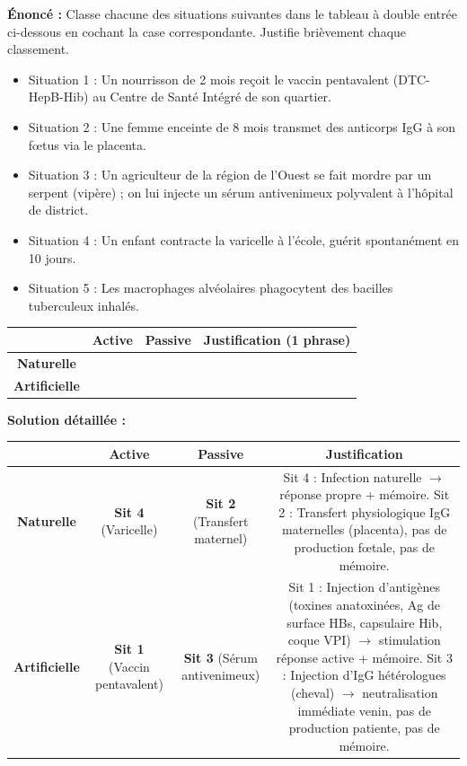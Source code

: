 \documentclass[11pt]{article}
\begin{document}
\begin{exoresolu}
    \textbf{Énoncé :} Classe chacune des situations suivantes dans le tableau à double entrée ci-dessous en cochant la case correspondante. Justifie brièvement chaque classement.
    \begin{itemize}
        \item Situation 1 : Un nourrisson de 2 mois reçoit le vaccin pentavalent (DTC-HepB-Hib) au Centre de Santé Intégré de son quartier.
        \item Situation 2 : Une femme enceinte de 8 mois transmet des anticorps IgG à son fœtus via le placenta.
        \item Situation 3 : Un agriculteur de la région de l'Ouest se fait mordre par un serpent (vipère) ; on lui injecte un sérum antivenimeux polyvalent à l'hôpital de district.
        \item Situation 4 : Un enfant contracte la varicelle à l'école, guérit spontanément en 10 jours.
        \item Situation 5 : Les macrophages alvéolaires phagocytent des bacilles tuberculeux inhalés.
    \end{itemize}
    \begin{center}
    \begin{tabular}{|c|c|c|c|}\hline
    & \textbf{Active} & \textbf{Passive} & \textbf{Justification (1 phrase)} \\ \hline
    \textbf{Naturelle} & & & \\ \hline
    \textbf{Artificielle} & & & \\ \hline
    \end{tabular}
    \end{center}
    \tcblower
    \textbf{Solution détaillée :}
    \begin{center}
    \begin{tabular}{|c|c|c|c|}\hline
    & \textbf{Active} & \textbf{Passive} & \textbf{Justification} \\ \hline
    \textbf{Naturelle} & \textbf{Sit 4} (Varicelle) & \textbf{Sit 2} (Transfert maternel) & Sit 4 : Infection naturelle $\rightarrow$ réponse propre + mémoire. Sit 2 : Transfert physiologique IgG maternelles (placenta), pas de production fœtale, pas de mémoire. \\ \hline
    \textbf{Artificielle} & \textbf{Sit 1} (Vaccin pentavalent) & \textbf{Sit 3} (Sérum antivenimeux) & Sit 1 : Injection d'antigènes (toxines anatoxinées, Ag de surface HBs, capsulaire Hib, coque VPI) $\rightarrow$ stimulation réponse active + mémoire. Sit 3 : Injection d'IgG hétérologues (cheval) $\rightarrow$ neutralisation immédiate venin, pas de production patiente, pas de mémoire. \\ \hline

\end{tabular}
\end{center}
\end{exoresolu}
\end{document}
